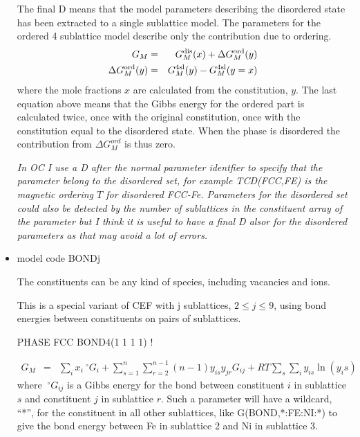 \documentclass[12pt]{article}
\begin{document}
\begin{itemize}
  The final D means that the model parameters describing the
  disordered state has been extracted to a single sublattice model.
  The parameters for the ordered 4 sublattice model describe only the
  contribution due to ordering.
  \begin{eqnarray}
    G_M &=& G_M^{\rm dis}(x) + \Delta G_M^{\rm ord}(y)\\
    \Delta G_M^{\rm ord}(y) &=& G_M^{\rm 4sl}(y) - G_M^{\rm 4sl}(y=x)
  \end{eqnarray}
  where the mole fractions $x$ are calculated from the constitution,
  $y$.  The last equation above means that the Gibbs energy for the
  ordered part is calculated twice, once with the original
  constitution, once with the constitution equal to the disordered
  state.  When the phase is disordered the contribution from $\Delta
  G_M^{ord}$ is thus zero.

  {\em In OC I use a D after the normal parameter identfier to specify
    that the parameter belong to the disordered set, for example
    TCD(FCC,FE) is the magnetic ordering $T$ for disordered FCC-Fe.
    Parameters for the disordered set could also be detected by the
    number of sublattices in the constituent array of the parameter
    but I think it is useful to have a final D alsor for the
    disordered parameters as that may avoid a lot of errors.}

\item model code BONDj

  The constituents can be any kind of species, including vacancies and
  ions.

  This is a special variant of CEF with j sublattices, $2\leq j \leq
  9$, using bond energies between constituents on pairs of
  sublattices.

  PHASE FCC BOND4(1 1 1 1) !

  \begin{eqnarray}
    G_M &=& \sum_i x_i ~^{\circ}G_i + \sum_{s=1}^n \sum_{r=2}^{n-1} (n-1) y_{is} y_{jr}G_{ij}+RT\sum_s \sum_i y_{is}\ln(y_is)
  \end{eqnarray}
  where $~^{\circ}G_{ij}$ is a Gibbs energy for the bond between
  constituent $i$ in sublattice $s$ and constituent $j$ in sublattice
  $r$.  Such a parameter will have a wildcard, ``*'', for the
  constituent in all other sublattices, like G(BOND,*:FE:NI:*) to give
  the bond energy between Fe in sublattice 2 and Ni in sublattice 3.
\end{itemize}
\end{document}
